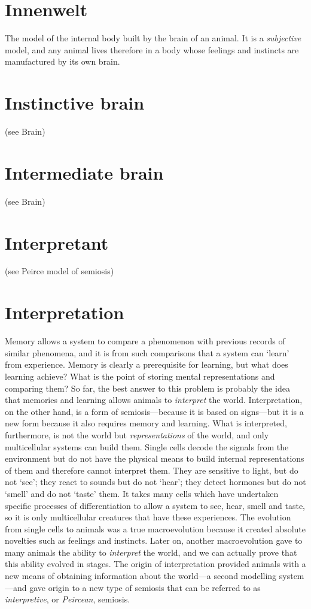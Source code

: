 \documentclass[12pt]{article}
\begin{document}
\section{Innenwelt}
The model of the internal body built by the brain of an animal. It is a \textit{subjective} model, and any animal lives therefore in a body whose feelings and instincts are manufactured by its own brain.


\section{Instinctive brain} (see Brain)


\section{Intermediate brain} (see Brain)


\section{Interpretant} (see Peirce model of semiosis)


\section{Interpretation}
Memory allows a system to compare a phenomenon with previous records of similar phenomena, and it is from such comparisons that a system can `learn' from experience. Memory is clearly a prerequisite for learning, but what does learning achieve? What is the point of storing mental representations and comparing them? So far, the best answer to this problem is probably the idea that memories and learning allows animals to \textit{interpret} the world. Interpretation, on the other hand, is a form of semiosis---because it is based on signs---but it is a new form because it also requires memory and learning. What is interpreted, furthermore, is not the world but \textit{representations} of the world, and only multicellular systems can build them. Single cells decode the signals from the environment but do not have the physical means to build internal representations of them and therefore cannot interpret them. They are sensitive to light, but do not `see'; they react to sounds but do not `hear'; they detect hormones but do not `smell' and do not `taste' them. It takes many cells which have undertaken specific processes of differentiation to allow a system to see, hear, smell and taste, so it is only multicellular creatures that have these experiences. The evolution from single cells to animals was a true macroevolution because it created absolute novelties such as feelings and instincts. Later on, another macroevolution gave to many animals the ability to \textit{interpret} the world, and we can actually prove that this ability evolved in stages. The origin of interpretation provided animals with a new means of obtaining information about the world---a second modelling system---and gave origin to a new type of semiosis that can be referred to as \textit{interpretive}, or \textit{Peircean}, semiosis. 
\end{document}
